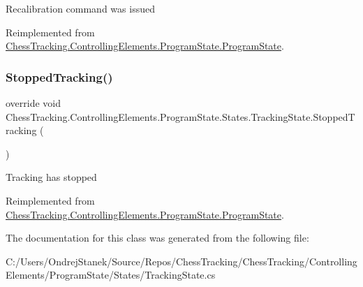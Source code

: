 Recalibration command was issued 



Reimplemented from \mbox{\hyperlink{class_chess_tracking_1_1_controlling_elements_1_1_program_state_1_1_program_state_a702ebae08f0615d645dfaa4334ea62fc}{Chess\+Tracking.\+Controlling\+Elements.\+Program\+State.\+Program\+State}}.

\mbox{\label{class_chess_tracking_1_1_controlling_elements_1_1_program_state_1_1_states_1_1_tracking_state_ad0e9790393a45fd5508f871864d09c04}} 
\subsubsection{\texorpdfstring{StoppedTracking()}{StoppedTracking()}}
{\footnotesize\ttfamily override void Chess\+Tracking.\+Controlling\+Elements.\+Program\+State.\+States.\+Tracking\+State.\+Stopped\+Tracking (\begin{DoxyParamCaption}{ }\end{DoxyParamCaption})\hspace{0.3cm}{\ttfamily [virtual]}}



Tracking has stopped 



Reimplemented from \mbox{\hyperlink{class_chess_tracking_1_1_controlling_elements_1_1_program_state_1_1_program_state_a0c86a45963ed8eb2b938f5d8f2d956ff}{Chess\+Tracking.\+Controlling\+Elements.\+Program\+State.\+Program\+State}}.



The documentation for this class was generated from the following file\+:\begin{DoxyCompactItemize}
\item 
C\+:/\+Users/\+Ondrej\+Stanek/\+Source/\+Repos/\+Chess\+Tracking/\+Chess\+Tracking/\+Controlling\+Elements/\+Program\+State/\+States/Tracking\+State.\+cs\end{DoxyCompactItemize}
